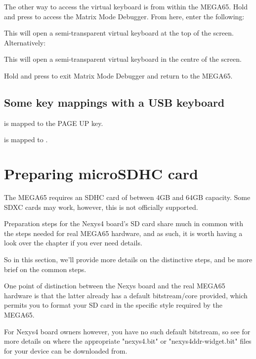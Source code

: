 The other way to access the virtual keyboard is from within the MEGA65. Hold \megasymbolkey and press  to access the Matrix Mode Debugger. From here, enter the following:


This will open a semi-transparent virtual keyboard at the top of the screen. Alternatively:


This will open a semi-transparent virtual keyboard in the centre of the screen.

Hold \megasymbolkey and press  to exit Matrix Mode Debugger and return to the MEGA65.

\subsection{Some key mappings with a USB keyboard}

 is mapped to the PAGE UP key.

 is mapped to .

\newpage

\section{Preparing microSDHC card}

The MEGA65 requires an SDHC card of between 4GB and 64GB capacity.  Some SDXC cards may work, however, this is not officially supported.

Preparation steps for the Nexys4 board's SD card share much in common with the steps needed for real MEGA65 hardware, and as such, it is worth having a look over the  chapter if you ever need details.

So in this section, we'll provide more details on the distinctive steps, and be more brief on the common steps.

One point of distinction between the Nexys board and the real MEGA65 hardware is that the latter already has a default bitstream/core provided, which permits you to format your SD card in the specific style required by the MEGA65.

For Nexys4 board owners however, you have no such default bitstream, so
see  for more details on where the appropriate "nexys4.bit" or "nexys4ddr-widget.bit" files for your device can be downloaded from.

